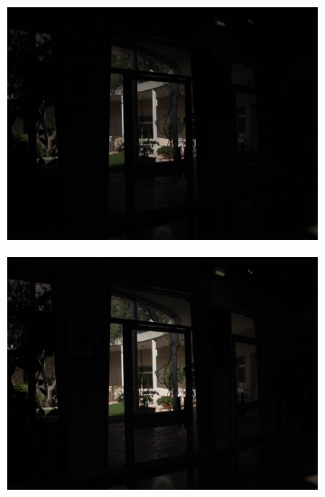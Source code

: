 \begin{figure}
\begin{subfigure}[b]{0.33\textwidth}
    \centering
    \includegraphics[width=\textwidth]{figures/chapter2/exposure/bh1.jpg}
\end{subfigure}\hfill
\begin{subfigure}[b]{0.33\textwidth}
    \centering
    \includegraphics[width=\textwidth]{figures/chapter2/exposure/bh2.jpg}
\end{subfigure}\hfill
\begin{subfigure}[b]{0.33\textwidth}
    \centering

\end{subfigure}
\end{figure}
